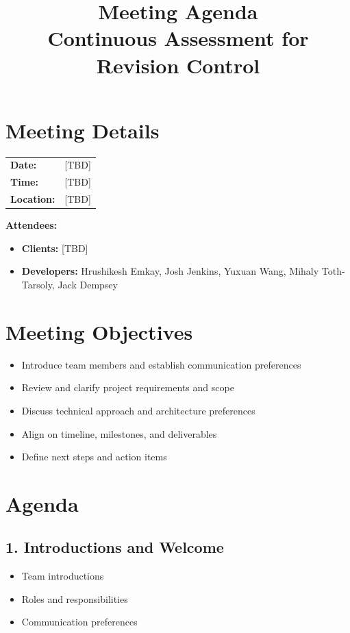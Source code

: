 \documentclass[11pt,a4paper]{article}
\title{\textbf{Meeting Agenda\\Continuous Assessment for Revision Control}}
\date{}
\begin{document}
\maketitle
\section*{Meeting Details}
\begin{tabular}{ll}
\textbf{Date:} & [TBD] \\
\textbf{Time:} & [TBD] \\
\textbf{Location:} & [TBD] \\
\end{tabular}

\vspace{0.5em}

\textbf{Attendees:}
\begin{itemize}[leftmargin=*]
    \item \textbf{Clients:} [TBD]
    \item \textbf{Developers:} Hrushikesh Emkay, Josh Jenkins, Yuxuan Wang, Mihaly Toth-Tarsoly, Jack Dempsey
\end{itemize}

\vspace{1em}

\section*{Meeting Objectives}
\begin{itemize}
    \item Introduce team members and establish communication preferences
    \item Review and clarify project requirements and scope
    \item Discuss technical approach and architecture preferences
    \item Align on timeline, milestones, and deliverables
    \item Define next steps and action items
\end{itemize}

\vspace{1em}
\section*{Agenda}

\vspace{1em}

\subsection*{1. Introductions and Welcome \hfill}
\begin{itemize}[leftmargin=*]
    \item Team introductions
    \item Roles and responsibilities
    \item Communication preferences
\end{itemize}
\end{document}
